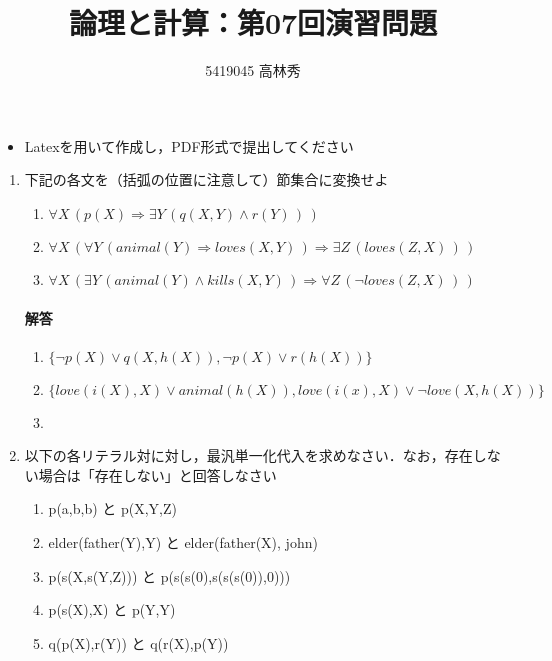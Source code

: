 \documentclass[dvipdfmx]{jsarticle}
\def\NO{07}
\def\LECTURENAME{論理と計算}
\begin{document}
\title{\LECTURENAME{}：第\NO{}回演習問題}

\author{5419045 高林秀}

\date{}
\maketitle

\begin{itemize}
\item Latexを用いて作成し，PDF形式で提出してください
\end{itemize}


\vspace*{\baselineskip}

\begin{enumerate}\setlength{\itemsep}{\baselineskip}

\item 下記の各文を（括弧の位置に注意して）節集合に変換せよ
  \begin{enumerate}

  \item $\forall X\,( p(X)\Rightarrow \exists Y\,(q(X,Y)\land r(Y)\,)\,)$

  \item $\forall X\,( \forall Y\,(animal(Y)\Rightarrow loves(X,Y)\,)\Rightarrow \exists Z\,(loves(Z,X)\,)\,)$

  \item $\forall X\,( \exists Y\,(animal(Y)\land kills(X,Y)\,)\Rightarrow \forall Z\,( \neg loves(Z,X)\,)\,)$
  \end{enumerate}
  \paragraph{解答}
  \begin{enumerate}
    \item $\{\neg p(X) \vee q(X, h(X)), \neg p(X) \vee r(h(X))\}$
    \item $\{love(i(X), X) \vee animal(h(X)), love(i(x), X) \vee \neg love(X, h(X))\}$
    \item
  \end{enumerate}

\item 以下の各リテラル対に対し，最汎単一化代入を求めなさい．なお，存在しない場合は「存在しない」と回答しなさい

  \begin{enumerate}
  \item p(a,b,b) と p(X,Y,Z)
  \item elder(father(Y),Y) と elder(father(X), john)
  \item p(s(X,s(Y,Z))) と p(s(s(0),s(s(s(0)),0)))
  \item p(s(X),X) と p(Y,Y)
  \item q(p(X),r(Y)) と q(r(X),p(Y))
  \end{enumerate}

\end{enumerate}
\end{document}
